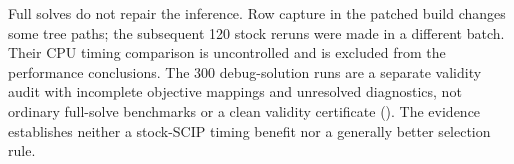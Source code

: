 Full solves do not repair the inference. Row capture in the patched
build changes some tree paths; the subsequent 120 stock reruns were made
in a different batch. Their CPU timing comparison is uncontrolled and
is excluded from the performance conclusions. The 300 debug-solution
runs are a separate validity audit with incomplete objective mappings
and unresolved diagnostics, not ordinary full-solve benchmarks or a
clean validity certificate (). The evidence establishes
neither a stock-SCIP timing benefit nor a generally better selection rule.
